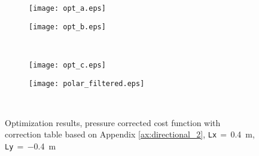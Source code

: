 \begin{figure}[H]
\begin{subfigure}[c]{0.5\textwidth}
\texttt{[image: opt\_a.eps]}
\label{fig:opt_res_a}
\end{subfigure}
\begin{subfigure}[c]{0.5\textwidth}
\texttt{[image: opt\_b.eps]}
\label{fig:opt_res_b}
\end{subfigure}\\
\hspace{0.1\textheight}
\begin{subfigure}[c]{0.5\textwidth}
\texttt{[image: opt\_c.eps]}
\label{fig:opt_res_c}
\end{subfigure}
\begin{subfigure}[c]{0.5\textwidth}
\texttt{[image: polar\_filtered.eps]}
\label{fig:opt_res_d}
\end{subfigure}\\
\hspace{0.1\textheight}
\caption{Optimization results, pressure corrected cost function with correction table based on Appendix \ref{ax:directional_2}, \textcolor{green3}{\texttt{Lx}}\,$=$\,\SI{0.4}{\meter}, \textcolor{green3}{\texttt{Ly}}\,$=\,$\SI{-0.4}{\meter}}
		\label{fig:opt_res}
\end{figure}


